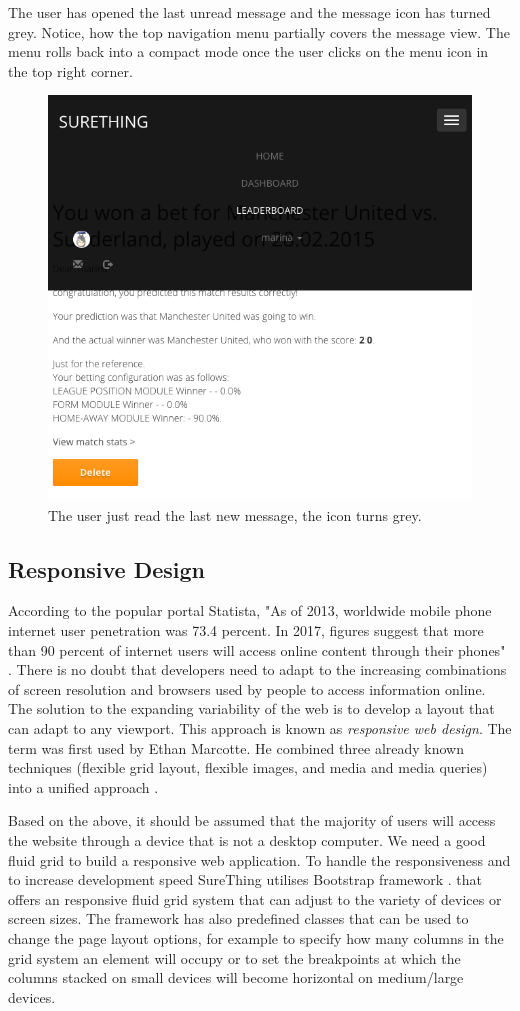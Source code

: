 The user has opened the last unread message and the message icon has turned grey. Notice, how the top navigation menu partially covers the message view. The menu rolls back into a compact mode once the user clicks on the menu icon in the top right corner.

\begin{figure}[H]
	\begin{center}
		\includegraphics[width=.60\textwidth]{impl/images/noMoreNewMessages}
		\caption{The user just read the last new message, the icon turns grey.} \label{fig:nomorenewmessages}
	\end{center}
\end{figure}

\subsection{Responsive Design}
According to the popular portal Statista, "As of 2013, worldwide mobile phone internet user penetration was 73.4 percent. In 2017, figures suggest that more than 90 percent of internet users will access online content through their phones" \citep{statistaReport}. There is no doubt that developers need to adapt to the increasing combinations of screen resolution and browsers used by people to access information online. The solution to the expanding variability of the web is to develop a layout that can adapt to any viewport. This approach is known as \emph{responsive web design}. The term was first used by Ethan Marcotte. He combined three already known techniques (flexible grid layout, flexible images, and media and media queries) into a unified approach \citep{book:frain2012responsive}.

Based on the above, it should be assumed that the majority of users will access the website through a device that is not a desktop computer. We need a good fluid grid to build a responsive web application. To handle the responsiveness and to increase development speed SureThing utilises Bootstrap framework \citet{documentation:Bootstrap3}. that offers an responsive fluid grid system that can adjust to the variety of devices or screen sizes. The framework has also predefined classes that can be used to change the page layout options, for example to specify how many columns in the grid system an element will occupy or to set the breakpoints at which the columns stacked on small devices will become horizontal on medium/large devices.


